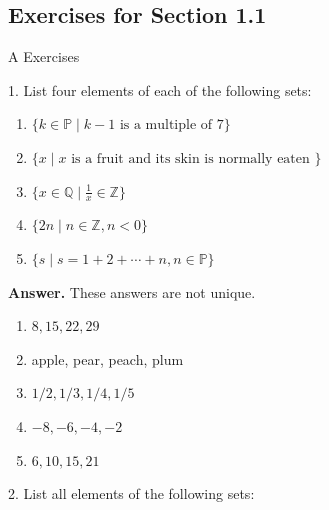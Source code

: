 \documentclass[10pt,]{book}
\theoremstyle{plain}
\theoremstyle{definition}
\theoremstyle{definition}
\theoremstyle{definition}
\theoremstyle{definition}
\begin{document}
\subsection[Exercises for Section 1.1 ]{Exercises for Section 1.1 }\label{exercises-1}
\hypertarget{exercisegroup-1}{}\typeout{************************************************}
\typeout{************************************************}
A Exercises%
\begin{exercisegroup}
\item[1.]\hypertarget{exercise-1}{}List four elements of each of the following sets:%
\par
\leavevmode%
\begin{enumerate}[label=\alph*]
\item\hypertarget{li-15}{} \(\{k \in  \mathbb{P} \mid {k - 1} \textrm{ is a multiple of 7}\}\) %
\item\hypertarget{li-16}{} \(\{x \mid x \textrm{ is a fruit and its skin is normally eaten }\}\)%
\item\hypertarget{li-17}{}\(\{x \in \mathbb{Q}\mid \frac{1}{x} \in \mathbb{Z}\}\)%
\item\hypertarget{li-18}{} \(\{2n \mid n \in \mathbb{Z}, n < 0 \}\)%
\item\hypertarget{li-19}{} \(\{s \mid s = 1 + 2 + \cdots  + n, n \in \mathbb{P}\}\)%
\end{enumerate}
%
\par\smallskip
\par\smallskip
\noindent\textbf{Answer.}\hypertarget{answer-1}{}\quad
These answers are not unique.%
\par
\leavevmode%
\begin{multicols}{3}
\begin{enumerate}[label=\alph*]
\item\hypertarget{li-20}{} \(8, 15, 22, 29\)%
\item\hypertarget{li-21}{} apple, pear, peach, plum %
\item\hypertarget{li-22}{} \(1/2, 1/3, 1/4, 1/5\)%
\item\hypertarget{li-23}{} \(-8, -6, -4, -2\)%
\item\hypertarget{li-24}{}\(6, 10, 15, 21\)%
\end{enumerate}
\end{multicols}
%
\item[2.]\hypertarget{exercise-2}{} List all elements of the following sets:%
\par
\leavevmode%
\begin{enumerate}[label=\alph*]

\end{enumerate}
\end{exercisegroup}
\end{document}
